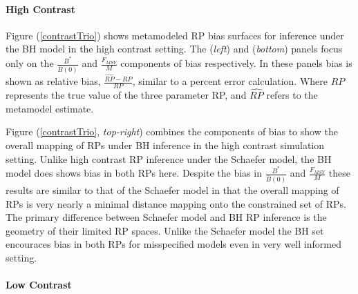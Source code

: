 \documentclass[12pt]{article}
\begin{document}
%
\paragraph{High Contrast}

%
Figure (\ref{contrastTrio}) shows metamodeled RP bias surfaces for inference 
under the BH model in the high contrast setting. The (\emph{left}) and 
(\emph{bottom}) panels focus only on the $\frac{B^*}{\bar B(0)}$ and 
$\frac{F_{MSY}}{M}$ components of bias respectively. In these panels bias is shown
as relative bias, $\frac{\hat{RP}-RP}{RP}$, similar to a percent error calculation.
Where $RP$ represents the true value of the three parameter RP, and $\hat{RP}$ 
refers to the metamodel estimate.

%
Figure (\ref{contrastTrio}, \emph{top-right}) combines the components of bias to 
show the overall mapping of RPs under BH inference in the high contrast 
simulation setting. Unlike high contrast RP inference under the Schaefer model, 
the BH model does shows bias in both RPs here. Despite the bias in 
$\frac{B^*}{\bar B(0)}$ and $\frac{F_{MSY}}{M}$ these results are similar to 
that of the Schaefer model in that the overall mapping of RPs is very nearly a 
minimal distance mapping onto the constrained set of RPs. %
The primary difference between Schaefer model and BH RP inference is the geometry of 
their limited RP spaces. Unlike the Schaefer model the BH set encouraces
bias in both RPs for misspecified models even in very well informed setting.

%
%
%


\paragraph{Low Contrast}
\end{document}
